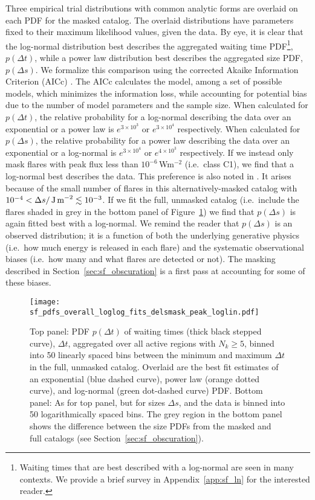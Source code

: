 Three empirical trial distributions with common analytic forms are overlaid on each PDF for the masked catalog. The overlaid distributions have parameters fixed to their maximum likelihood values, given the data. By eye, it is clear that the log-normal distribution best describes the aggregated waiting time PDF\footnote{Waiting times that are best described with a log-normal are seen in many contexts. We provide a brief survey in Appendix~\ref{app:sf_ln} for the interested reader.}, $p(\Delta t)$, while a power law distribution best describes the aggregated size PDF, $p(\Delta s)$. We formalize this comparison using the corrected Akaike Information Criterion (AICc) \citep{Akaike1974, Hurvich1989}. The AICc calculates the model, among a set of possible models, which minimizes the information loss, while accounting for potential bias due to the number of model parameters and the sample size. When calculated for $p(\Delta t)$, the relative probability for a log-normal describing the data over an exponential or a power law is $e^{3\times10^3}$ or $e^{3\times10^4}$ respectively. When calculated for $p(\Delta s)$, the relative probability for a power law describing the data over an exponential or a log-normal is $e^{3\times10^4}$ or $e^{4\times10^3}$ respectively. If we instead only mask flares with peak flux less than $10^{-6}\,$Wm$^{-2}$ (i.e.~class C1), we find that a log-normal best describes the data. This preference is also noted in \citet{Verbeeck2019}. It arises because of the small number of flares in this alternatively-masked catalog with $10^{-4} < \Delta s /\textrm{\,J\,m}^{-2} \lesssim 10^{-3}$. If we fit the full, unmasked catalog (i.e.~include the flares shaded in grey in the bottom panel of Figure~\ref{fig:sf_pdfs_overall}) we find that $p(\Delta s)$ is again fitted best with a log-normal. We remind the reader that $p(\Delta s)$ is an observed distribution; it is a function of both the underlying generative physics (i.e.~how much energy is released in each flare) and the systematic observational biases (i.e.~how many and what flares are detected or not). The masking described in Section~\ref{sec:sf_obscuration} is a first pass at accounting for some of these biases.

\begin{figure}
\centering
\texttt{[image: sf\_pdfs\_overall\_loglog\_fits\_delsmask\_peak\_loglin.pdf]}
\caption{Top panel: PDF $p(\Delta t)$ of waiting times (thick black stepped curve), $\Delta t$, aggregated over all active regions with $N_k \geq 5$, binned into 50 linearly spaced bins between the minimum and maximum $\Delta t$ in the full, unmasked catalog. Overlaid are the best fit estimates of an exponential (blue dashed curve), power law (orange dotted curve), and log-normal (green dot-dashed curve) PDF. Bottom panel: As for top panel, but for sizes $\Delta s$, and the data is binned into 50 logarithmically spaced bins. The grey region in the bottom panel shows the difference between the size PDFs from the masked and full catalogs (see Section~\ref{sec:sf_obscuration}).}
\label{fig:sf_pdfs_overall}
\end{figure}

